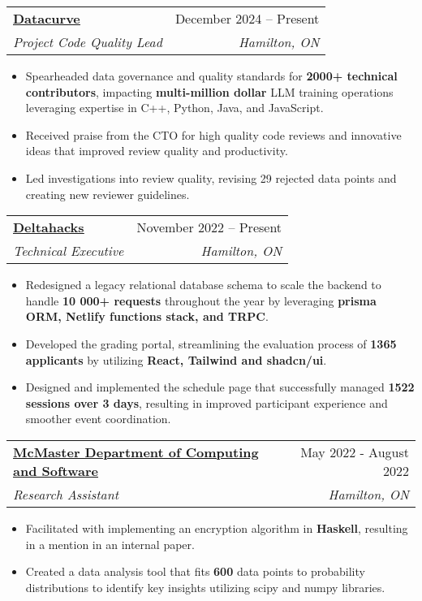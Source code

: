 \documentclass[letterpaper,11pt]{article}
\makeatletter
\newcommand{\resumeItem}[1]{
  \item\small{
    {#1 \vspace{-2pt}}
  }
}
\newcommand{\resumeSubheading}[4]{
  \vspace{-2pt}\item
    \begin{tabular*}{0.97\textwidth}[t]{l@{\extracolsep{\fill}}r}
      \textbf{#1} & #2 \\
      \textit{\small#3} & \textit{\small #4} \\
    \end{tabular*}\vspace{-7pt}
}
\newcommand{\resumeItemListStart}{\begin{itemize}}
\newcommand{\resumeItemListEnd}{\end{itemize}\vspace{-5pt}}
\makeatother
\begin{document}
\resumeSubheading
{\href{https://datacurve.ai/}{\underline{Datacurve}}}{December 2024 -- Present}
{Project Code Quality Lead}{Hamilton, ON}
\resumeItemListStart
\resumeItem{Spearheaded data governance and quality standards for \textbf{2000+ technical contributors}, impacting \textbf{multi-million dollar} LLM training operations leveraging expertise in C++, Python, Java, and JavaScript.}
\resumeItem{Received praise from the CTO for high quality code reviews and innovative ideas that improved review quality and productivity.}
\resumeItem{Led investigations into review quality, revising 29 rejected data points and creating new reviewer guidelines.}
\resumeItemListEnd

\resumeSubheading
{\href{https://deltahacks.com/}{\underline{Deltahacks}}}{November 2022 -- Present}
{Technical Executive}{Hamilton, ON}
\resumeItemListStart
\resumeItem{Redesigned a legacy relational database schema to scale the backend to handle \textbf{10 000+ requests} throughout the year by leveraging \textbf{prisma ORM, Netlify functions stack, and TRPC}.}
\resumeItem{Developed the grading portal, streamlining the evaluation process of \textbf{1365 applicants} by utilizing \textbf{React, Tailwind and shadcn/ui}.}
\resumeItem{Designed and implemented the schedule page that successfully managed \textbf{1522 sessions over 3 days}, resulting in improved participant experience and smoother event coordination.}
\resumeItemListEnd


\resumeSubheading
{\href{https://www.eng.mcmaster.ca/cas/}{\underline{McMaster Department of Computing and Software}}}{May 2022 - August 2022}
{Research Assistant}{Hamilton, ON}
\resumeItemListStart
\resumeItem{Facilitated with implementing an encryption algorithm in \textbf{Haskell}, resulting in a mention in an internal paper.}
\resumeItem{Created a data analysis tool that fits \textbf{600} data points to probability distributions to identify key insights utilizing scipy and numpy libraries.}
\resumeItemListEnd
\end{document}
